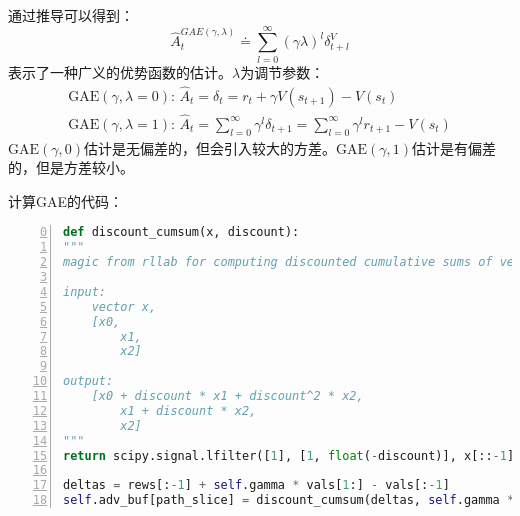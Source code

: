 通过推导可以得到：
\begin{equation*}
    \hat{A}_t^{GAE(\gamma,\lambda)} \doteq \sum_{l=0}^\infty (\gamma \lambda)^l \delta_{t+l}^V
\end{equation*}
表示了一种广义的优势函数的估计。$\lambda$为调节参数：
\begin{gather*}
    \text{GAE}(\gamma,\lambda=0):\, \hat{A}_t = \delta_t = r_t + \gamma V(s_{t+1}) - V(s_t) \\
    \text{GAE}(\gamma,\lambda=1):\, \hat{A}_t = \sum_{l=0}^\infty \gamma^l \delta_{t+1} = \sum_{l=0}^\infty \gamma^l r_{t+1} - V(s_t)
\end{gather*}
$\text{GAE}(\gamma,0)$估计是无偏差的，但会引入较大的方差。$\text{GAE}(\gamma,1)$估计是有偏差的，但是方差较小。

计算GAE的代码：
\begin{lstlisting}[language=python,numbers=left,firstnumber = 0,numberstyle=\tiny,breaklines = true,keywordstyle=\color{blue!70},commentstyle=\color{red!50!green!50!blue!50},frame=shadowbox, rulesepcolor=\color{red!20!green!20!blue!20}]
def discount_cumsum(x, discount):
"""
magic from rllab for computing discounted cumulative sums of vectors.

input: 
    vector x, 
    [x0, 
        x1, 
        x2]

output:
    [x0 + discount * x1 + discount^2 * x2,  
        x1 + discount * x2,
        x2]
"""
return scipy.signal.lfilter([1], [1, float(-discount)], x[::-1], axis=0)[::-1]

deltas = rews[:-1] + self.gamma * vals[1:] - vals[:-1]
self.adv_buf[path_slice] = discount_cumsum(deltas, self.gamma * self.lam)
\end{lstlisting}






